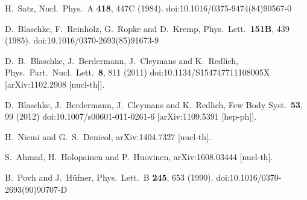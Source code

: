 \documentclass[12pt]{article}
\begin{document}
\begin{thebibliography}{99}
  H.~Satz,
  Nucl.\ Phys.\ A {\bf 418}, 447C (1984).
  doi:10.1016/0375-9474(84)90567-0

  D.~Blaschke, F.~Reinholz, G.~Ropke and D.~Kremp,
  Phys.\ Lett.\  {\bf 151B}, 439 (1985).
  doi:10.1016/0370-2693(85)91673-9
	
  D.~B.~Blaschke, J.~Berdermann, J.~Cleymans and K.~Redlich,
  Phys.\ Part.\ Nucl.\ Lett.\  {\bf 8}, 811 (2011)
  doi:10.1134/S154747711108005X
  [arXiv:1102.2908 [nucl-th]].

  D.~Blaschke, J.~Berdermann, J.~Cleymans and K.~Redlich,
  Few Body Syst.\  {\bf 53}, 99 (2012)
  doi:10.1007/s00601-011-0261-6
  [arXiv:1109.5391 [hep-ph]].

H.~Niemi and G.~S.~Denicol,
arXiv:1404.7327 [nucl-th].

S.~Ahmad, H.~Holopainen and P.~Huovinen,
arXiv:1608.03444 [nucl-th].
	
  B.~Povh and J.~H{\"u}fner,
  Phys.\ Lett.\ B {\bf 245}, 653 (1990).
  doi:10.1016/0370-2693(90)90707-D


\end{thebibliography}
\end{document}
